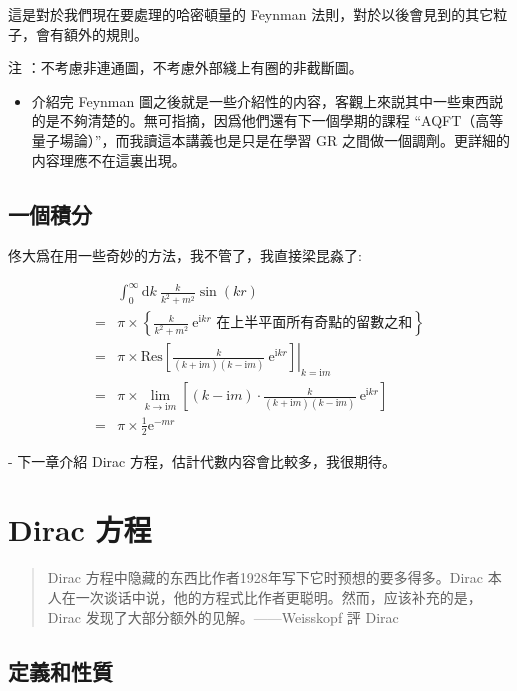 \documentclass{article}
\begin{document}
這是對於我們現在要處理的哈密頓量的 Feynman 法則，對於以後會見到的其它粒子，會有額外的規則。

注 ：不考慮非連通圖，不考慮外部綫上有圈的非截斷圖。

\begin{itemize}
\item 介紹完 Feynman 圖之後就是一些介紹性的内容，客觀上來説其中一些東西説的是不夠清楚的。無可指摘，因爲他們還有下一個學期的課程 “AQFT（高等量子場論）”，而我讀這本講義也是只是在學習 GR 之間做一個調劑。更詳細的内容理應不在這裏出現。
\end{itemize}

\subsection{一個積分}

佟大爲在用一些奇妙的方法，我不管了，我直接梁昆淼了:

$$
\begin{aligned}
& \int^{\infty}_0\mathrm{d}k\ \frac{k}{k^2+m^2}\sin(kr)                                                                               \\
= & \pi\times\left\{\frac{k}{k^2+m^2}\ \mathrm{e}^{\mathrm{i}kr}\text{ 在上半平面所有奇點的留數之和}\right\}                                          \\
= & \pi\times\mathrm{Res}\left.\left[\frac{k}{(k+\mathrm{i}m)(k-\mathrm{i}m)}\ \mathrm{e}^{\mathrm{i}kr}\right]\right|_{k=\mathrm{i}m}  \\
= & \pi\times\lim_{k\to\mathrm{i}m}\left[(k-\mathrm{i}m)\cdot\frac{k}{(k+\mathrm{i}m)(k-\mathrm{i}m)}\ \mathrm{e}^{\mathrm{i}kr}\right] \\
= & \pi\times\frac{1}{2}\mathrm{e}^{-mr}
\end{aligned}
$$

- 下一章介紹 Dirac 方程，估計代數内容會比較多，我很期待。

\section{Dirac 方程}

\begin{quote}
Dirac 方程中隐藏的东西比作者1928年写下它时预想的要多得多。Dirac 本人在一次谈话中说，他的方程式比作者更聪明。然而，应该补充的是，Dirac 发现了大部分额外的见解。——Weisskopf 評 Dirac
\end{quote}

\subsection{定義和性質}
\end{document}
